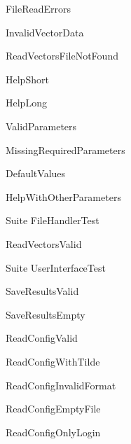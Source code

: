 \begin{DoxyRefList}
\label{test__test000034}%
%
File\+Read\+Errors 

\label{test__test000035}%
%
Invalid\+Vector\+Data  
\item[Member \mbox{\hyperlink{test__main_8cpp_ad978ef563c93ffa0a173a366ad758a94}{SUITE}} (File\+Handler\+Test)]\label{test__test000010}%
%
Read\+Vectors\+File\+Not\+Found  
\item[Member \mbox{\hyperlink{test__main_8cpp_a272cd10408b6db923d4b32b323207f5a}{SUITE}} (User\+Interface\+Test)]\label{test__test000002}%
%
Help\+Short 

\label{test__test000003}%
%
Help\+Long 

\label{test__test000004}%
%
Valid\+Parameters 

\label{test__test000005}%
%
Missing\+Required\+Parameters 

\label{test__test000006}%
%
Default\+Values 

\label{test__test000007}%
%
Help\+With\+Other\+Parameters  
\item[Member \mbox{\hyperlink{test__main_8cpp_ad978ef563c93ffa0a173a366ad758a94}{SUITE}} (File\+Handler\+Test)]\label{test__test000008}%
%
Suite File\+Handler\+Test 

\label{test__test000009}%
%
Read\+Vectors\+Valid  
\item[Member \mbox{\hyperlink{test__main_8cpp_a272cd10408b6db923d4b32b323207f5a}{SUITE}} (User\+Interface\+Test)]\label{test__test000001}%
%
Suite User\+Interface\+Test  
\item[Member \mbox{\hyperlink{test__main_8cpp_ad978ef563c93ffa0a173a366ad758a94}{SUITE}} (File\+Handler\+Test)]\label{test__test000011}%
%
Save\+Results\+Valid 

\label{test__test000012}%
%
Save\+Results\+Empty 

\label{test__test000013}%
%
Read\+Config\+Valid 

\label{test__test000014}%
%
Read\+Config\+With\+Tilde 

\label{test__test000015}%
%
Read\+Config\+Invalid\+Format 

\label{test__test000016}%
%
Read\+Config\+Empty\+File 

\label{test__test000017}%
%
Read\+Config\+Only\+Login 
\end{DoxyRefList}